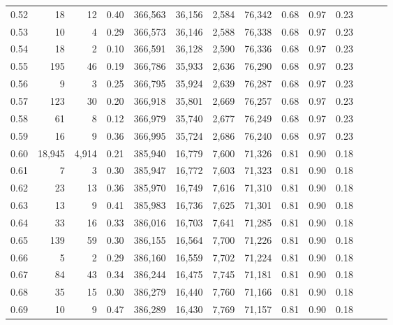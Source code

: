 \begin{tabular}{rrrrrrrrrrrrrr}
0.52 &      18 &      12 &  0.40 &  366,563 &   36,156 &   2,584 &  76,342 &  0.68 &  0.97 &      0.23 \\
0.53 &      10 &       4 &  0.29 &  366,573 &   36,146 &   2,588 &  76,338 &  0.68 &  0.97 &      0.23 \\
0.54 &      18 &       2 &  0.10 &  366,591 &   36,128 &   2,590 &  76,336 &  0.68 &  0.97 &      0.23 \\
0.55 &     195 &      46 &  0.19 &  366,786 &   35,933 &   2,636 &  76,290 &  0.68 &  0.97 &      0.23 \\
0.56 &       9 &       3 &  0.25 &  366,795 &   35,924 &   2,639 &  76,287 &  0.68 &  0.97 &      0.23 \\
0.57 &     123 &      30 &  0.20 &  366,918 &   35,801 &   2,669 &  76,257 &  0.68 &  0.97 &      0.23 \\
0.58 &      61 &       8 &  0.12 &  366,979 &   35,740 &   2,677 &  76,249 &  0.68 &  0.97 &      0.23 \\
0.59 &      16 &       9 &  0.36 &  366,995 &   35,724 &   2,686 &  76,240 &  0.68 &  0.97 &      0.23 \\
0.60 &  18,945 &   4,914 &  0.21 &  385,940 &   16,779 &   7,600 &  71,326 &  0.81 &  0.90 &      0.18 \\
0.61 &       7 &       3 &  0.30 &  385,947 &   16,772 &   7,603 &  71,323 &  0.81 &  0.90 &      0.18 \\
0.62 &      23 &      13 &  0.36 &  385,970 &   16,749 &   7,616 &  71,310 &  0.81 &  0.90 &      0.18 \\
0.63 &      13 &       9 &  0.41 &  385,983 &   16,736 &   7,625 &  71,301 &  0.81 &  0.90 &      0.18 \\
0.64 &      33 &      16 &  0.33 &  386,016 &   16,703 &   7,641 &  71,285 &  0.81 &  0.90 &      0.18 \\
0.65 &     139 &      59 &  0.30 &  386,155 &   16,564 &   7,700 &  71,226 &  0.81 &  0.90 &      0.18 \\
0.66 &       5 &       2 &  0.29 &  386,160 &   16,559 &   7,702 &  71,224 &  0.81 &  0.90 &      0.18 \\
0.67 &      84 &      43 &  0.34 &  386,244 &   16,475 &   7,745 &  71,181 &  0.81 &  0.90 &      0.18 \\
0.68 &      35 &      15 &  0.30 &  386,279 &   16,440 &   7,760 &  71,166 &  0.81 &  0.90 &      0.18 \\
0.69 &      10 &       9 &  0.47 &  386,289 &   16,430 &   7,769 &  71,157 &  0.81 &  0.90 &      0.18 \\

\end{tabular}
